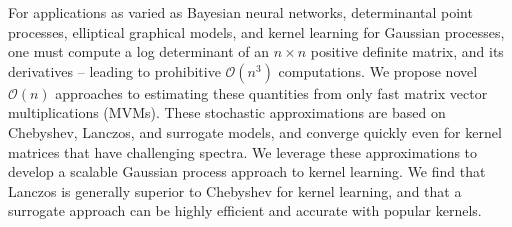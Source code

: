 For applications as varied as Bayesian neural networks, determinantal point
processes, elliptical graphical models, and kernel learning for Gaussian
processes, one must compute a log determinant of an $n \times n$ positive
definite matrix, and its derivatives -- leading to prohibitive $\mathcal{O}
(n^3)$ computations.  We propose novel $\mathcal{O}(n)$ approaches to estimating
these quantities from only fast matrix vector multiplications (MVMs). These
stochastic approximations are based on Chebyshev, Lanczos, and surrogate models,
and converge quickly even for kernel matrices that have challenging spectra.  We
leverage these approximations to develop a scalable Gaussian process approach to
kernel learning. We find that Lanczos is generally superior to Chebyshev for
kernel learning, and that a surrogate approach can be highly efficient and
accurate with popular kernels.